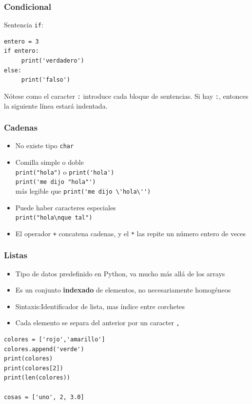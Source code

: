 \documentclass{beamer}
\begin{document}
\begin{frame}[fragile]
\frametitle{Condicional}

Sentencia \verb|if|:

\begin{footnotesize}
\begin{verbatim}
entero = 3
if entero:
     print('verdadero')
else:
     print('falso')
\end{verbatim}
\end{footnotesize}
Nótese como el caracter \verb|:| introduce cada bloque de sentencias. Si hay \verb|:|, entonces la siguiente línea estará indentada.
\end{frame}



\begin{frame}[fragile]
\frametitle{Cadenas}

\begin{itemize}
\item No existe tipo \verb|char|
\item 
Comilla simple o doble \\
\verb|print("hola")|  o \verb|print('hola')|  \\
\verb|print('me dijo "hola"')| \\
más legible que \verb|print('me dijo \'hola\'')|
\item 
Puede haber caracteres especiales\\
\verb|print("hola\nque tal")|   

\item El operador \verb|+| concatena cadenas, y el \verb|*| las repite
  un número entero de veces
\end{itemize}
\end{frame}


\begin{frame}[fragile]
\frametitle{Listas}

\begin{itemize}
\item Tipo de datos predefinido en Python, va mucho más allá de los
  arrays
\item Es un conjunto {\bf indexado} de elementos, no necesariamente homogéneos
\item Sintaxis:Identificador de lista, mas índice entre corchetes
\item Cada elemento se separa del anterior por un caracter \verb|,|
\end{itemize}
  \begin{footnotesize}
\begin{verbatim}
colores = ['rojo','amarillo']
colores.append('verde')
print(colores)
print(colores[2])
print(len(colores))

cosas = ['uno', 2, 3.0]

\end{verbatim}
  \end{footnotesize}

\end{frame}
\end{document}
